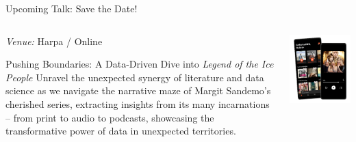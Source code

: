 \documentclass[
    NAME={Dr. Helga Ingimundardóttir},
    EMAIL={helgaingim@hi.is},
    FACULTY={Industrial Engineering},
    SUBTITLE={From Smart Algorithms in Fish Portioning to Pioneering Pipelines in Long-Range DNA Sequencing and Digital Travel},
    SEMINAR={IVT Faculty Gathering},
    DATE={September 6, 2023}
]{hi-latex/hi-beamer}
\begin{document}
\begin{frame}{Upcoming Talk: Save the Date!}
\begin{columns}
\begin{column}{0.65\textwidth}
    \emph{Venue:} Harpa / Online\\
    \bigskip
    \begin{alertblock}{Pushing Boundaries: A Data-Driven Dive into \emph{Legend of the Ice People}}
    Unravel the unexpected synergy of literature and data science as we navigate the narrative maze of Margit Sandemo's
    cherished series, extracting insights from its many incarnations -- from print to audio to podcasts, showcasing the
    transformative power of data in unexpected territories.
    \end{alertblock}
\end{column}
\begin{column}{0.35\textwidth}
    \includegraphics[width=\textwidth]{iskisur.jpg}
\end{column}
\end{columns}

\end{frame}
\end{document}

